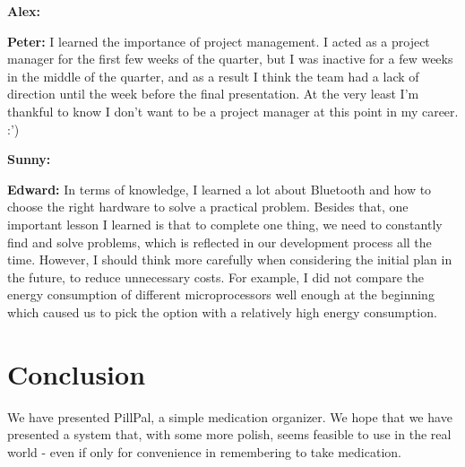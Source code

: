 \documentclass[sigconf]{acmart}
\begin{document}
\textbf{Alex:}

\textbf{Peter:} I learned the importance of project management. I acted as a project manager for the first few weeks of the quarter, but I was inactive for a few weeks in the middle of the quarter, and as a result I think the team had a lack of direction until the week before the final presentation. At the very least I'm thankful to know I don't want to be a project manager at this point in my career. :')

\textbf{Sunny:}

\textbf{Edward:} In terms of knowledge, I learned a lot about Bluetooth and how to choose the right hardware to solve a practical problem. Besides that, one important lesson I learned is that to complete one thing, we need to constantly find and solve problems, which is reflected in our development process all the time. However, I should think more carefully when considering the initial plan in the future, to reduce unnecessary costs. For example, I did not compare the energy consumption of different microprocessors well enough at the beginning which caused us to pick the option with a relatively high energy consumption. 

\section{Conclusion}
We have presented PillPal, a simple medication organizer. We hope that we have presented a system that, with some more polish, seems feasible to use in the real world - even if only for convenience in remembering to take medication.



\end{document}
